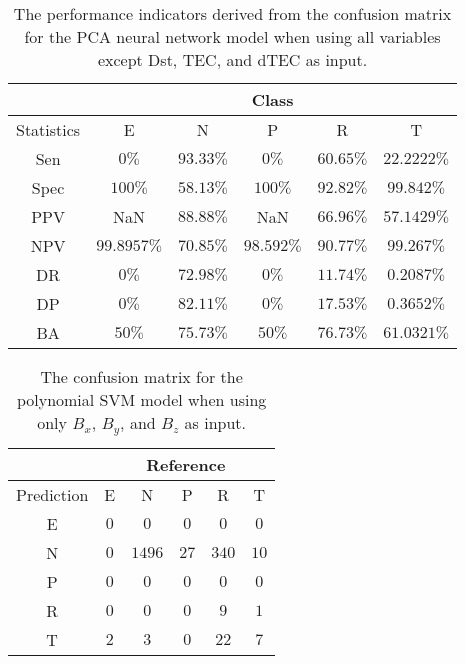 \begin{table}[!ht]
	\centering
	\begin{tabular}{|c|c|c|c|c|c|}
		\hline
		 & \multicolumn{5}{c|}{Class} \\ \hline
		Statistics & E & N & P & R & T \\ \hline
		Sen & $0\%$ & $93.33\%$ & $0\%$ & $60.65\%$ & $22.2222\%$ \\ \hline
		Spec & $100\%$ & $58.13\%$ & $100\%$ & $92.82\%$ & $99.842\%$ \\ \hline
		PPV & NaN & $88.88\%$ & NaN & $66.96\%$ & $57.1429\%$ \\ \hline
		NPV & $99.8957\%$ & $70.85\%$ & $98.592\%$ & $90.77\%$ & $99.267\%$ \\ \hline
		DR & $0\%$ & $72.98\%$ & $0\%$ & $11.74\%$ & $0.2087\%$ \\ \hline
		DP & $0\%$ & $82.11\%$ & $0\%$ & $17.53\%$ & $0.3652\%$ \\ \hline
		BA & $50\%$ & $75.73\%$ & $50\%$ & $76.73\%$ & $61.0321\%$ \\ \hline
	\end{tabular}
	\caption{The performance indicators derived from the confusion matrix for the PCA neural network model when using all variables except Dst, TEC, and dTEC as input.}
	\label{tab:cs:reverse:noTEC:pcaNNet}
\end{table}

\begin{table}[!ht]
	\centering
	\begin{tabular}{|c|c|c|c|c|c|}
		\hline
		 & \multicolumn{5}{|c|}{Reference} \\ \hline
		 Prediction & E & N & P & R & T \\ \hline
		 E & $0$ & $0$ & $0$ & $0$ & $0$ \\ \hline
		 N & $0$ & $1496$ & $27$ & $340$ & $10$ \\ \hline
		 P & $0$ & $0$ & $0$ & $0$ & $0$ \\ \hline
		 R & $0$ & $0$ & $0$ & $9$ & $1$ \\ \hline
		 T & $2$ & $3$ & $0$ & $22$ & $7$ \\ \hline
	\end{tabular}
	\caption{The confusion matrix for the polynomial SVM model when using only $B_{x}$, $B_{y}$, and $B_{z}$ as input.}
	\label{tab:cm:coord:svmPoly}
\end{table}

